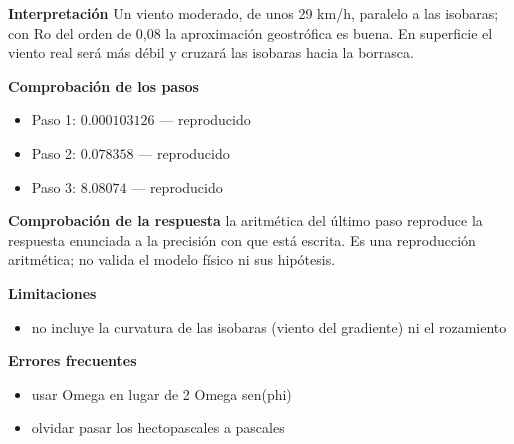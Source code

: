 \documentclass[10pt,openany]{book}
\begin{document}
\begin{tcolorbox}[title={Problema resuelto}, studiumworked, breakable]
\noindent\textbf{Interpretación}
Un viento moderado, de unos 29 km/h, paralelo a las isobaras; con Ro del orden de 0,08 la aproximación geostrófica es buena. En superficie el viento real será más débil y cruzará las isobaras hacia la borrasca.

\noindent\textbf{Comprobación de los pasos}
\begin{itemize}
\item Paso 1: $0.000103126$ — reproducido
\item Paso 2: $0.078358$ — reproducido
\item Paso 3: $8.08074$ — reproducido
\end{itemize}

\noindent\textbf{Comprobación de la respuesta} la aritmética del último paso reproduce la respuesta enunciada a la precisión con que está escrita. Es una reproducción aritmética; no valida el modelo físico ni sus hipótesis.

\noindent\textbf{Limitaciones}
\begin{itemize}
\item no incluye la curvatura de las isobaras (viento del gradiente) ni el rozamiento
\end{itemize}

\noindent\textbf{Errores frecuentes}
\begin{itemize}
\item usar Omega en lugar de 2 Omega sen(phi)
\item olvidar pasar los hectopascales a pascales
\end{itemize}
\end{tcolorbox}
\end{document}

